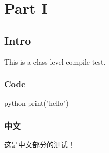 \documentclass[outputdir=build,chapterstyle=en,shorthand=false,indent=true,boxes=true,refs=true,algorithm=true,code=true]{Hypo-Note}
\begin{document}
\makecover
\tableofcontents

\chapter{Part I}

\section{Intro}
This is a class-level compile test.

\subsection{Code}
\begin{hypocode}[linenos=true]{python}
print("hello")
\end{hypocode}

\subsection{中文}
这是中文部分的测试！
\end{document}
